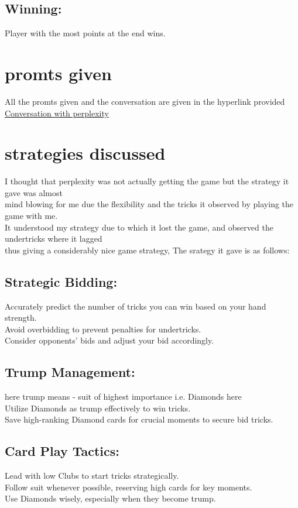 \documentclass[12 pt]{report}
\begin{document}
\subsection{Winning:}
Player with the most points at the end wins. \\

\section{promts given}
All the promts given and the conversation are given in the hyperlink provided \\
\href{https://www.perplexity.ai/search/do-you-know-gHKgfZmeSsy.cOMl1H1eSQ}{Conversation with perplexity}

\section{strategies discussed}
I thought that perplexity was not actually getting the game but the strategy it gave was almost \\
mind blowing for me due the flexibility and the tricks it observed by playing the game with me.\\
It understood my strategy due to which it lost the game, and observed the undertricks where it lagged \\
thus giving a considerably nice game strategy, The srategy it gave is as follows:
\subsection{Strategic Bidding:}
Accurately predict the number of tricks you can win based on your hand strength. \\
Avoid overbidding to prevent penalties for undertricks. \\
Consider opponents' bids and adjust your bid accordingly. \\
\subsection{Trump Management:}
here trump means - suit of highest importance i.e. Diamonds here \\ 
Utilize Diamonds as trump effectively to win tricks. \\
Save high-ranking Diamond cards for crucial moments to secure bid tricks. \\
\subsection{Card Play Tactics:}
Lead with low Clubs to start tricks strategically. \\
Follow suit whenever possible, reserving high cards for key moments. \\
Use Diamonds wisely, especially when they become trump. \\
\end{document}
